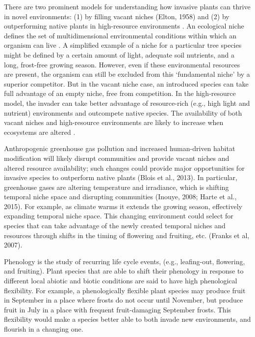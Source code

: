 \documentclass[12pt]{article}\usepackage[]{graphicx}\usepackage[]{color}
\begin{document}
	There are two prominent models for understanding how invasive plants can thrive in novel environments: (1) by filling vacant niches (Elton, 1958) and (2) by outperforming native plants in high-resource environments \parencite{Davis2001,Daehler2003}. An ecological niche defines the set of multidimensional environmental conditions within which an organism can live \parencite{Hutchinson1965}. A simplified example of a niche for a particular tree species might be defined by a certain amount of light, adequate soil nutrients, and a long, frost-free growing season.  However, even if these environmental resources are present, the organism can still be excluded from this ‘fundamental niche’ by a superior competitor. But in the vacant niche case, an introduced species can take full advantage of an empty niche, free from competition. In the high-resource model, the invader can take better advantage of resource-rich (e.g., high light and nutrient) environments and outcompete native species.  The availability of both vacant niches and high-resource environments are likely to increase when ecosystems are altered \parencite{Tilman2001}.
	
	Anthropogenic greenhouse gas pollution and increased human-driven habitat modification will likely disrupt communities and provide vacant niches and altered resource availability; such changes could provide major opportunities for invasive species to outperform native plants (Blois et al., 2013). In particular, greenhouse gases are altering temperature and irradiance, which is shifting temporal niche space and disrupting communities (Inouye, 2008; Harte et al., 2015).  For example, as climate warms it extends the growing season, effectively expanding temporal niche space. This changing environment could select for species that can take advantage of the newly created temporal niches and resources through shifts in the timing of flowering and fruiting, etc. (Franks et al, 2007).
	
	Phenology is the study of recurring life cycle events, (e.g., leafing-out, flowering, and fruiting). Plant species that are able to shift their phenology in response to different local abiotic and biotic conditions are said to have high phenological flexibility. For example, a phenologically flexible plant species may produce fruit in September in a place where frosts do not occur until November, but produce fruit in July in a place with frequent fruit-damaging September frosts. This flexibility would make a species better able to both invade new environments, and flourish in a changing one.
	
\end{document}
